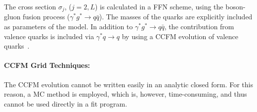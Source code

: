 The cross section $\sigma_j$, ($j= 2 , L$) is calculated in a FFN   scheme,  using 
the boson-gluon fusion process ($\gamma^* g^* \to q \bar{q}$). The masses of the 
quarks are explicitly included as  parameters of the model.
In addition to $\gamma^* g^* \to q\bar{q}$,  the contribution from valence quarks is included 
via $\gamma^* q \to q$   by using  a CCFM evolution of 
valence quarks~\cite{Deak:2010gk,Deak:2011ga,Hautmann:2013tba}. 

  
 

\paragraph{CCFM Grid Techniques:} \rm

The CCFM evolution cannot be written easily in an analytic closed form. For this 
reason, a MC method is employed, which is, however, time-consuming, and thus
cannot be used directly in a fit program. 

